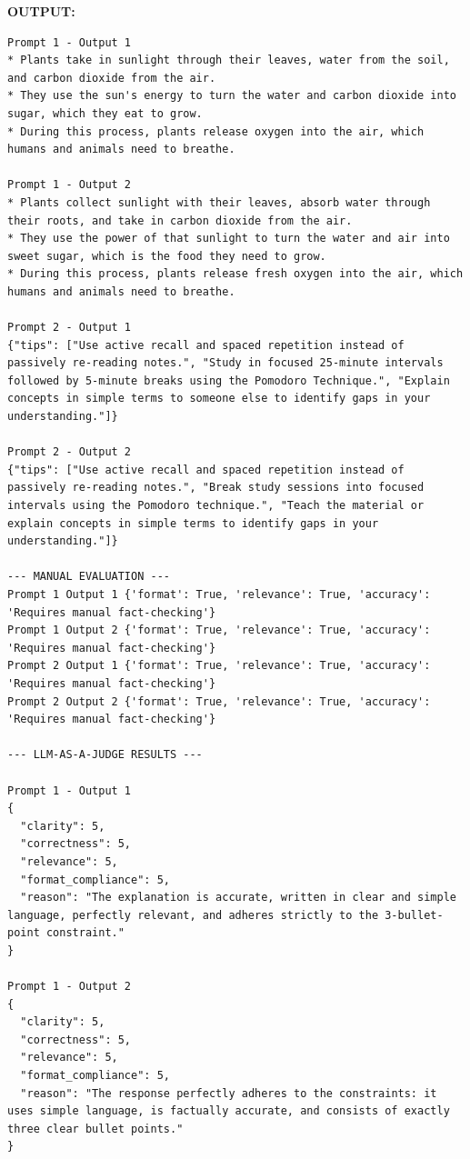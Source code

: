 \documentclass[10pt,a4paper]{article}
\newcommand{\sectionlabel}[1]{\par\vspace{3pt}\noindent\textbf{#1}\par\nopagebreak}
\begin{document}
\sectionlabel{OUTPUT:}
\begin{lstlisting}[style=output]
Prompt 1 - Output 1
* Plants take in sunlight through their leaves, water from the soil, and carbon dioxide from the air.
* They use the sun's energy to turn the water and carbon dioxide into sugar, which they eat to grow.
* During this process, plants release oxygen into the air, which humans and animals need to breathe.

Prompt 1 - Output 2
* Plants collect sunlight with their leaves, absorb water through their roots, and take in carbon dioxide from the air.
* They use the power of that sunlight to turn the water and air into sweet sugar, which is the food they need to grow.
* During this process, plants release fresh oxygen into the air, which humans and animals need to breathe.

Prompt 2 - Output 1
{"tips": ["Use active recall and spaced repetition instead of passively re-reading notes.", "Study in focused 25-minute intervals followed by 5-minute breaks using the Pomodoro Technique.", "Explain concepts in simple terms to someone else to identify gaps in your understanding."]}

Prompt 2 - Output 2
{"tips": ["Use active recall and spaced repetition instead of passively re-reading notes.", "Break study sessions into focused intervals using the Pomodoro technique.", "Teach the material or explain concepts in simple terms to identify gaps in your understanding."]}

--- MANUAL EVALUATION ---
Prompt 1 Output 1 {'format': True, 'relevance': True, 'accuracy': 'Requires manual fact-checking'}
Prompt 1 Output 2 {'format': True, 'relevance': True, 'accuracy': 'Requires manual fact-checking'}
Prompt 2 Output 1 {'format': True, 'relevance': True, 'accuracy': 'Requires manual fact-checking'}
Prompt 2 Output 2 {'format': True, 'relevance': True, 'accuracy': 'Requires manual fact-checking'}

--- LLM-AS-A-JUDGE RESULTS ---

Prompt 1 - Output 1
{
  "clarity": 5,
  "correctness": 5,
  "relevance": 5,
  "format_compliance": 5,
  "reason": "The explanation is accurate, written in clear and simple language, perfectly relevant, and adheres strictly to the 3-bullet-point constraint."
}

Prompt 1 - Output 2
{
  "clarity": 5,
  "correctness": 5,
  "relevance": 5,
  "format_compliance": 5,
  "reason": "The response perfectly adheres to the constraints: it uses simple language, is factually accurate, and consists of exactly three clear bullet points."
}


\end{lstlisting}
\end{document}

